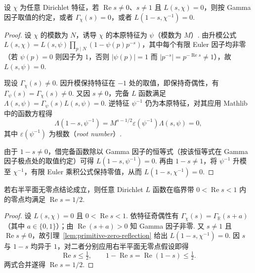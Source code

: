 \begin{lemma}[由本原特征的函数方程推出一般特征的零点对称性]
\label{lem:primitive-zero-reflection}
\emitthmsource
设 $\chi$ 为任意 Dirichlet 特征，若 $\operatorname{Re}s\ne0$、$s\ne1$ 且 $L(s,\chi)=0$，则按 Gamma 因子取值的约定，或者 $\Gamma_\chi(s)=0$，或者 $L(1-s,\chi^{-1})=0$.
\end{lemma}
\begin{proof}
设 $\chi$ 的模数为 $N$，诱导 $\chi$ 的本原特征为 $\psi$（模数为 $M$）. 由升模公式 $L(s,\chi)=L(s,\psi)\prod_{p\mid N}(1-\psi(p)p^{-s})$，其中每个有限 Euler 因子均非零（若 $\psi(p)=0$ 则因子为 $1$，否则 $|\psi(p)|=1$ 而 $|p^{-s}|=p^{-\operatorname{Re}s}\ne1$），故 $L(s,\psi)=0$.

现设 $\Gamma_\chi(s)\ne0$. 因升模保持特征在 $-1$ 处的取值，即保持奇偶性，有 $\Gamma_\psi(s)=\Gamma_\chi(s)\ne0$. 又因 $s\ne0$，完备 $L$ 函数满足 $\Lambda(s,\psi)=\Gamma_\psi(s)L(s,\psi)=0$. 逆特征 $\psi^{-1}$ 仍为本原特征，对其应用 Mathlib 中的函数方程得
\[
 \Lambda(1-s,\psi^{-1})=M^{s-1/2}\varepsilon(\psi^{-1})\Lambda(s,\psi)=0,
\]
其中 $\varepsilon(\psi^{-1})$ 为根数（\emph{root number}）.

由于 $1-s\ne0$，借完备函数除以 Gamma 因子的恒等式（按该恒等式在 Gamma 因子极点处的取值约定）可得 $L(1-s,\psi^{-1})=0$. 再由 $1-s\ne1$，将 $\psi^{-1}$ 升模至 $\chi^{-1}$，有限 Euler 乘积公式保持零值，从而 $L(1-s,\chi^{-1})=0$.
\end{proof}

\begin{lemma}
\label{lem:dirichlet-reflection}
\emitthmsource
若右半平面无零点结论成立，则任意 Dirichlet $L$ 函数在临界带 $0<\operatorname{Re}s<1$ 内的零点均满足 $\operatorname{Re}s=1/2$.
\end{lemma}
\begin{proof}
设 $L(s,\chi)=0$ 且 $0<\operatorname{Re}s<1$. 依特征奇偶性有 $\Gamma_\chi(s)=\Gamma_{\mathbb R}(s+a)$（其中 $a\in\{0,1\}$）；由 $\operatorname{Re}(s+a)>0$ 知 Gamma 因子非零. 又 $s\ne1$ 且 $\operatorname{Re}s\ne0$，故引理~\ref{lem:primitive-zero-reflection} 给出 $L(1-s,\chi^{-1})=0$. 因 $s$ 与 $1-s$ 均异于 $1$，对二者分别应用右半平面无零点假设即得
\[
 \operatorname{Re}s\le\tfrac12,
 \qquad 1-\operatorname{Re}s=\operatorname{Re}(1-s)\le\tfrac12.
\]
两式合并遂得 $\operatorname{Re}s=1/2$.
\end{proof}

